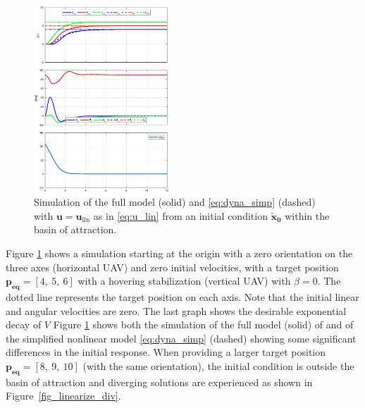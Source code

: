 \begin{figure}[ht!]
    \centering
    \includegraphics[trim=0cm 0.6cm 0cm 1cm,clip,width=1\columnwidth, height= 7cm]{figures/converge2.eps}
    \vspace*{-5mm}
    \caption{Simulation of the full model (solid) and \eqref{eq:dyna_simp} (dashed) with $\boldsymbol{u} = \boldsymbol{u}_{\text{lin}}$ as in 
    \eqref{eq:u_lin} from an initial condition $\boldsymbol{\tilde x_0}$ within the basin of attraction.}
    \label{fig_linearize_conv}
\end{figure}
Figure \ref{fig_linearize_conv} shows a simulation starting at the origin with a zero orientation on the three axes (horizontal UAV)
and zero initial velocities,
with a target position $\boldsymbol{p_{\text{eq}}} = [4,~5,~6]$ with a hovering stabilization (vertical UAV) with $\beta = 0$. The dotted line represents the target position on each axis. Note that the initial linear and angular velocities are zero.  The last graph shows the desirable exponential decay of $V$
Figure \ref{fig_linearize_conv} shows both the simulation of the full model (solid) of \cite{sansou:stage} and of the simplified nonlinear model \eqref{eq:dyna_simp} (dashed) showing some significant differences in the initial response.
When providing a larger target position $\boldsymbol{p_{\text{eq}}} =[8,~9,~10]$ (with the same orientation), the initial condition is outside the basin of attraction and diverging solutions are experienced as shown in Figure~\ref{fig_linearize_div}.
\vspace*{-4mm}
